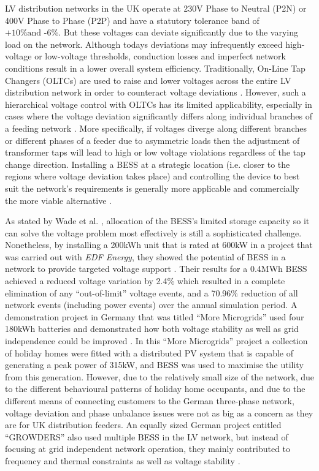 LV distribution networks in the UK operate at 230V Phase to Neutral (P2N) or 400V Phase to Phase (P2P) and have a statutory tolerance band of $\text{+10\% and -6\%}$.
But these voltages can deviate significantly due to the varying load on the network.
Although todays deviations may infrequently exceed high-voltage or low-voltage thresholds, conduction losses and imperfect network conditions result in a lower overall system efficiency.
Traditionally, On-Line Tap Changers (OLTCs) are used to raise and lower voltages across the entire LV distribution network in order to counteract voltage deviations \cite{Sun2009}.
However, such a hierarchical voltage control with OLTCs has its limited applicability, especially in cases where the voltage deviation significantly differs along individual branches of a feeding network \cite{Zangs2016}.
More specifically, if voltages diverge along different branches or different phases of a feeder due to asymmetric loads then the adjustment of transformer taps will lead to high or low voltage violations regardless of the tap change direction.
Installing a BESS at a strategic location (i.e. closer to the regions where voltage deviation takes place) and controlling the device to best suit the network's requirements is generally more applicable and commercially the more viable alternative \cite{Liserre2010}.

As stated by Wade et al. \cite{Wade2009}, allocation of the BESS's limited storage capacity so it can solve the voltage problem most effectively is still a sophisticated challenge.
Nonetheless, by installing a 200kWh unit that is rated at 600kW in a project that was carried out with \textit{EDF Energy}, they showed the potential of BESS in a network to provide targeted voltage support \cite{Wade2010}.
Their results for a 0.4MWh BESS achieved a reduced voltage variation by 2.4\% which resulted in a complete elimination of any ``out-of-limit'' voltage events, and a 70.96\% reduction of all network events (including power events) over the annual simulation period.
A demonstration project in Germany that was titled ``More Microgrids'' used four 180kWh batteries and demonstrated how both voltage stability as well as grid independence could be improved \cite{Overbeeke2010}.
In this ``More Microgrids'' project a collection of holiday homes were fitted with a distributed PV system that is capable of generating a peak power of 315kW, and BESS was used to maximise the utility from this generation.
However, due to the relatively small size of the network, due to the different behavioural patterns of holiday home occupants, and due to the different means of connecting customers to the German three-phase network, voltage deviation and phase unbalance issues were not as big as a concern as they are for UK distribution feeders.
An equally sized German project entitled ``GROWDERS'' also used multiple BESS in the LV network, but instead of focusing at grid independent network operation, they mainly contributed to frequency and thermal constraints as well as voltage stability \cite{GROWDERS2011}.

